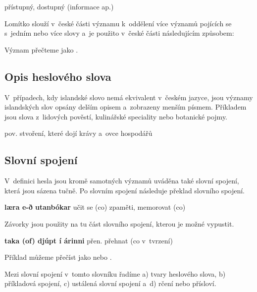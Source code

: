 \blspace
  \dicEntry {}  {přístupný, dostupný (informace ap.)}
\blspace

Lomítko slouží v~české části významu k~oddělení více významů pojících se s~jedním nebo více slovy a~je použito v~české části následujícím způsobem:

\blspace
  \dicEntry {}   
\blspace

Význam přečteme jako .

\subsection*{Opis heslového slova}

V~případech, kdy islandské slovo nemá ekvivalent v~českém jazyce, jsou významy islandských slov opsány delším opisem a~zobrazeny menším písmem. Příkladem jsou slova z~lidových pověstí, kulinářské speciality nebo botanické pojmy.

\blspace
  \dicEntry {}   {\footnotesize{pov.}} {\footnotesize{stvoření, které dojí krávy a~ovce hospodářů}}
\blspace

\subsection*{Slovní spojení}

V~definici hesla jsou kromě samotných významů uváděna také slovní spojení, která jsou sázena tučně. Po slovním spojení následuje překlad slovního spojení.

\blspace
  \dicEntry {}   \textbf{læra e-ð utanbókar} {učit se (co) zpaměti, memorovat (co)}
\blspace

Závorky jsou použity na tu část slovního spojení, kterou je možné vypustit.

\blspace
  \dicEntry {}   \textbf{taka (of) djúpt í árinni} {\footnotesize{přen.}} {přehnat (co v~tvrzení)}
\blspace

Příklad můžeme přečíst jako  nebo .

Mezi slovní spojení v~tomto slovníku řadíme a) tvary heslového slova, b) příkladová spojení, c) ustálená slovní spojení a~d) rčení nebo přísloví.

